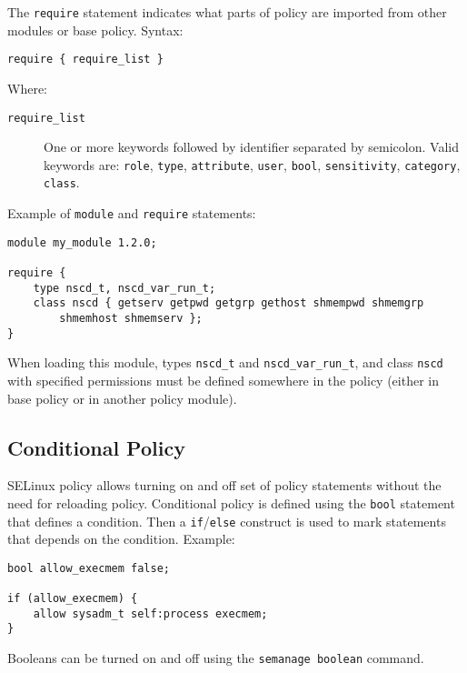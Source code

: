 The \texttt{require} statement indicates what parts of policy are imported from
other modules or base policy. Syntax:
\begin{lstlisting}[language=te]
require { require_list }
\end{lstlisting}
Where:
\begin{description}
    \item [\texttt{require\_list}] One or more keywords followed by identifier
        separated by semicolon. Valid keywords are: \texttt{role},
        \texttt{type}, \texttt{attribute}, \texttt{user}, \texttt{bool},
        \texttt{sensitivity}, \texttt{category}, \texttt{class}.
\end{description}

Example of \texttt{module} and \texttt{require} statements:
\begin{lstlisting}[language=te]
module my_module 1.2.0;

require {
    type nscd_t, nscd_var_run_t;
    class nscd { getserv getpwd getgrp gethost shmempwd shmemgrp
        shmemhost shmemserv };
}
\end{lstlisting}
When loading this module, types \texttt{nscd\_t} and \texttt{nscd\_var\_run\_t},
and class \texttt{nscd} with specified permissions must be defined somewhere in
the policy (either in base policy or in another policy module).

\subsection{Conditional Policy}

SELinux policy allows turning on and off set of policy statements without the
need for reloading policy. Conditional policy is defined using the \texttt{bool}
statement that defines a condition. Then a \texttt{if}/\texttt{else} construct
is used to mark statements that depends on the condition. Example:
\begin{lstlisting}[language=te]
bool allow_execmem false;

if (allow_execmem) {
    allow sysadm_t self:process execmem;
}
\end{lstlisting}
Booleans can be turned on and off using the \texttt{semanage boolean} command.

